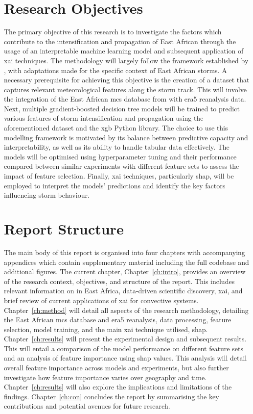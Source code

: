 \section{Research Objectives}

The primary objective of this research is to investigate the factors which contribute to the intensification and propagation of East African  through the usage of an interpretable machine learning model and subsequent application of \acrshort{xai} techniques. The methodology will largely follow the framework established by \cite{Hunt2024}, with adaptations made for the specific context of East African storms. A necessary prerequisite for achieving this objective is the creation of a dataset that captures relevant meteorological features along the storm track. This will involve the integration of the East African \acrshort{mcs} database from \cite{Hill2023} with \acrshort{era5} reanalysis data. Next, multiple gradient-boosted decision tree models will be trained to predict various features of storm intensification and propagation using the aforementioned dataset and the \acrfull{xgb} Python library. The choice to use this modelling framework is motivated by its balance between predictive capacity and interpretability, as well as its ability to handle tabular data effectively. The models will be optimised using hyperparameter tuning and their performance compared between similar experiments with different feature sets to assess the impact of feature selection. Finally, \acrshort{xai} techniques, particularly \acrshort{shap}, will be employed to interpret the models' predictions and identify the key factors influencing storm behaviour.

\section{Report Structure}

The main body of this report is organised into four chapters with accompanying appendices which contain supplementary material including the full codebase and additional figures. The current chapter, Chapter~\ref{ch:intro}, provides an overview of the research context, objectives, and structure of the report. This includes relevant information on  in East Africa, data-driven scientific discovery, \acrfull{xai}, and brief review of current applications of \acrshort{xai} for convective systems. Chapter~\ref{ch:method} will detail all aspects of the research methodology, detailing the East African \acrshort{mcs} database and \acrshort{era5} reanalysis, data processing, feature selection, model training, and the main \acrshort{xai} technique utilised, \acrshort{shap}. Chapter~\ref{ch:results} will present the experimental design and subsequent results. This will entail a comparison of the model performance on different feature sets and an analysis of feature importance using \acrshort{shap} values. This analysis will detail overall feature importance across models and experiments, but also further investigate how feature importance varies over geography and time. Chapter~\ref{ch:results} will also explore the implications and limitations of the findings. Chapter~\ref{ch:con} concludes the report by summarising the key contributions and potential avenues for future research.